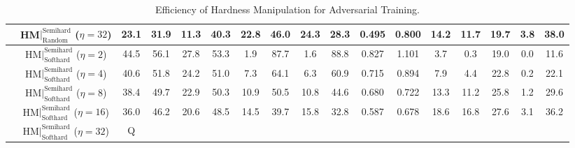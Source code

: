 \begin{table*}
{\begin{tabular}{cc|cccc|ccccc|ccccc|c}
 & HM$|_{\text{Random}}^{\text{Semihard}}$ ($\eta=32$) & 23.1 & 31.9 & 11.3 & 40.3 & 22.8 & 46.0 & 24.3 & 28.3 & 0.495 & 0.800 & 14.2 & 11.7 & 19.7 & 3.8 & 38.0\tabularnewline
\hline 
 & HM$|_{\text{Softhard}}^{\text{Semihard}}$ ($\eta=2$) & 44.5 & 56.1 & 27.8 & 53.3 & 1.9 & 87.7 & 1.6 & 88.8 & 0.827 & 1.101 & 3.7 & 0.3 & 19.0 & 0.0 & 11.6\tabularnewline
 & HM$|_{\text{Softhard}}^{\text{Semihard}}$ ($\eta=4$) & 40.6 & 51.8 & 24.2 & 51.0 & 7.3 & 64.1 & 6.3 & 60.9 & 0.715 & 0.894 & 7.9 & 4.4 & 22.8 & 0.2 & 22.1\tabularnewline
 & HM$|_{\text{Softhard}}^{\text{Semihard}}$ ($\eta=8$) & 38.4 & 49.7 & 22.9 & 50.3 & 10.9 & 50.5 & 10.8 & 44.6 & 0.680 & 0.722 & 13.3 & 11.2 & 25.8 & 1.2 & 29.6\tabularnewline
 & HM$|_{\text{Softhard}}^{\text{Semihard}}$ ($\eta=16$) & 36.0 & 46.2 & 20.6 & 48.5 & 14.5 & 39.7 & 15.8 & 32.8 & 0.587 & 0.678 & 18.6 & 16.8 & 27.6 & 3.1 & 36.2\tabularnewline
 & HM$|_{\text{Softhard}}^{\text{Semihard}}$ ($\eta=32$) & Q &  &  &  &  &  &  &  &  &  &  &  &  &  & \tabularnewline
\end{tabular}

}

\caption{Efficiency of Hardness Manipulation for Adversarial Training.}
\label{tab:hmeff}
\end{table*}

